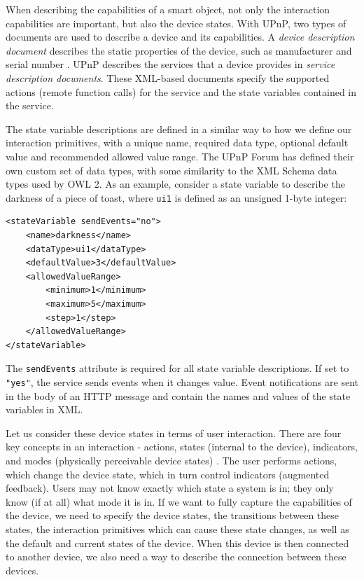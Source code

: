When describing the capabilities of a smart object, not only the interaction capabilities are important, but also the device states. With \ac{UPnP}, two types of documents are used to describe a device and its capabilities. A \emph{device description document} describes the static properties of the device, such as manufacturer and serial number \cite{Jeronimo2009}. \ac{UPnP} describes the services that a device provides in \emph{service description documents}. These XML-based documents specify the supported actions (remote function calls) for the service and the state variables contained in the service. 

The state variable descriptions are defined in a similar way to how we define our interaction primitives, with a unique name, required data type, optional default value and recommended allowed value range. The \ac{UPnP} Forum has defined their own custom set of data types, with some similarity to the XML Schema data types used by \ac{OWL} 2. As an example, consider a state variable to describe the darkness of a piece of toast, where \texttt{ui1} is defined as an unsigned 1-byte integer:

\begin{verbatim}
<stateVariable sendEvents="no">
	<name>darkness</name>
	<dataType>ui1</dataType>
	<defaultValue>3</defaultValue>
	<allowedValueRange>
		<minimum>1</minimum>
		<maximum>5</maximum>
		<step>1</step>
	</allowedValueRange>
</stateVariable>
\end{verbatim}

The \texttt{sendEvents} attribute is required for all state variable descriptions. If set to \texttt{"yes"}, the service sends events when it changes value. Event notifications are sent in the body of an HTTP message and contain the names and values of the state variables in XML. 

Let us consider these device states in terms of user interaction. There are four key concepts in an interaction - actions, states (internal to the device), indicators, and modes (physically perceivable device states) \cite{Thimbleby2007}. The user performs actions, which change the device state, which in turn control indicators (augmented feedback). Users may not know exactly which state a system is in; they only know (if at all) what mode it is in. If we want to fully capture the capabilities of the device, we need to specify the device states, the transitions between these states, the interaction primitives which can cause these state changes, as well as the default and current states of the device. When this device is then connected to another device, we also need a way to describe the connection between these devices.


